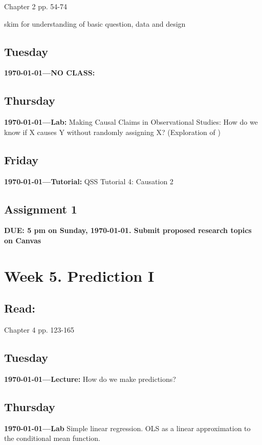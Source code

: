 \citet{Imai2022-pm} Chapter 2 pp. 54-74

\citet{Ferwerda2014-th} skim for understanding of basic question, data and design


\subsection{Tuesday} \textbf{\today---NO CLASS:} 


\AdvanceDate[2]

\subsection{Thursday} \textbf{\today---Lab:}  Making Causal Claims in Observational Studies: How do we know if X causes Y without randomly assigning X? (Exploration of \citet{Ferwerda2014-th})

\AdvanceDate[1]
\subsection{Friday} \textbf{\today---Tutorial:} QSS Tutorial 4: Causation 2
\AdvanceDate[2]

\vspace{2em}

\subsection{Assignment 1} \textbf{DUE: 5 pm on Sunday, \today. Submit proposed research topics on Canvas}

\AdvanceDate[2]


\vspace{2em}

\section{Week 5. Prediction I}

\subsection{Read:}

\citet{Imai2022-pm} Chapter 4 pp. 123-165


\subsection{Tuesday} \textbf{\today---Lecture:} How do we make predictions?
\AdvanceDate[2]

\subsection{Thursday} \textbf{\today---Lab} Simple linear regression. OLS as a linear approximation to the conditional mean function. 

